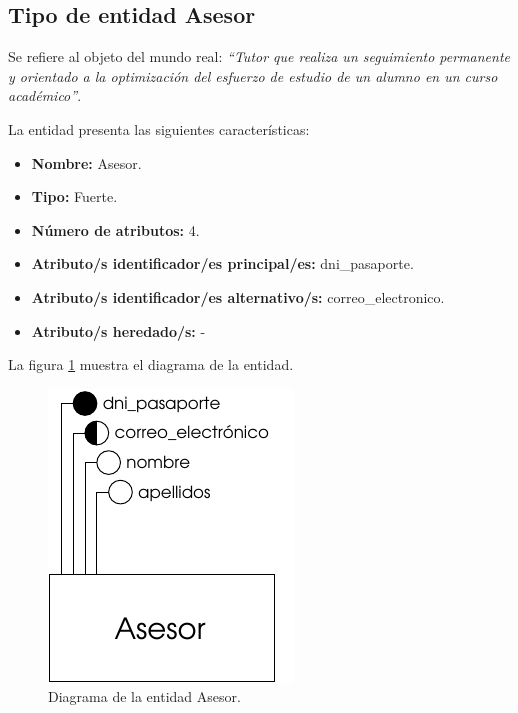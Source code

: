 \subsection{Tipo de entidad Asesor}

   \begin{description}

   \item[Definición] Se refiere al objeto del mundo real: \emph{``Tutor que
        realiza un seguimiento permanente y orientado a la optimización del
        esfuerzo de estudio de un alumno en un curso académico''}.

   \item[Características] La entidad presenta las siguientes características:
      \begin{itemize}
         \item \textbf{Nombre:} Asesor.
         \item \textbf{Tipo:} Fuerte.
         \item \textbf{Número de atributos:} 4.
         \item \textbf{Atributo/s identificador/es principal/es:} dni\_pasaporte.
         \item \textbf{Atributo/s identificador/es alternativo/s:} correo\_electronico.
         \item \textbf{Atributo/s heredado/s:} -
      \end{itemize}

   \item[Diagrama] La figura \ref{diagramaAsesor} muestra el diagrama de la entidad.
   \item \begin{figure}[!ht]
            \begin{center}
            \includegraphics[]{07.Modelo_Entidad-Interrelacion/7.2.Analisis_Entidades/diagramas/asesor.pdf}
            \caption{Diagrama de la entidad Asesor.}
            \label{diagramaAsesor}
            \end{center}
         \end{figure}


\end{description}
